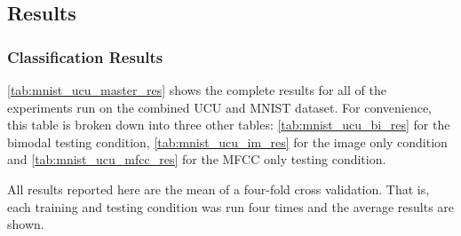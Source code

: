 \begin{table}
	\end{table}




\subsection{Results}

\subsubsection{Classification Results}
\autoref{tab:mnist_ucu_master_res} shows the complete results for all of the experiments run on the combined UCU and MNIST dataset. For convenience, this table is broken down into three other tables: \autoref{tab:mnist_ucu_bi_res} for the bimodal testing condition, \autoref{tab:mnist_ucu_im_res} for the image only condition and \autoref{tab:mnist_ucu_mfcc_res} for the MFCC only testing condition. 

All results reported here are the mean of a four-fold cross validation. That is, each training and testing condition was run four times and the average results are shown.

